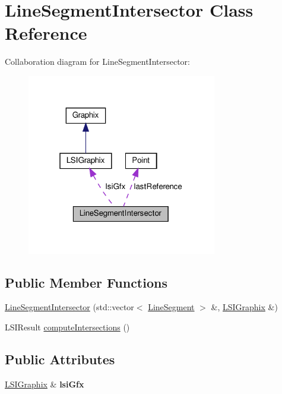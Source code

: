 \hypertarget{classLineSegmentIntersector}{}\section{Line\+Segment\+Intersector Class Reference}
\label{classLineSegmentIntersector}


Collaboration diagram for Line\+Segment\+Intersector\+:
\nopagebreak
\begin{figure}[H]
\begin{center}
\leavevmode
\includegraphics[width=235pt]{classLineSegmentIntersector__coll__graph}
\end{center}
\end{figure}
\subsection*{Public Member Functions}
\begin{DoxyCompactItemize}
\item 
\hyperlink{classLineSegmentIntersector_abfe17083938ad4ee705fbe7d0051f209}{Line\+Segment\+Intersector} (std\+::vector$<$ \hyperlink{classLineSegment}{Line\+Segment} $>$ \&, \hyperlink{classLSIGraphix}{L\+S\+I\+Graphix} \&)
\item 
L\+S\+I\+Result \hyperlink{classLineSegmentIntersector_a261dcce43777e1954e81589ca89529ee}{compute\+Intersections} ()
\end{DoxyCompactItemize}
\subsection*{Public Attributes}
\begin{DoxyCompactItemize}
\item 
\mbox{\label{classLineSegmentIntersector_a82113ff9c3ccbf2c276c67a45401430a}} 
\hyperlink{classLSIGraphix}{L\+S\+I\+Graphix} \& {\bfseries lsi\+Gfx}
\end{DoxyCompactItemize}
